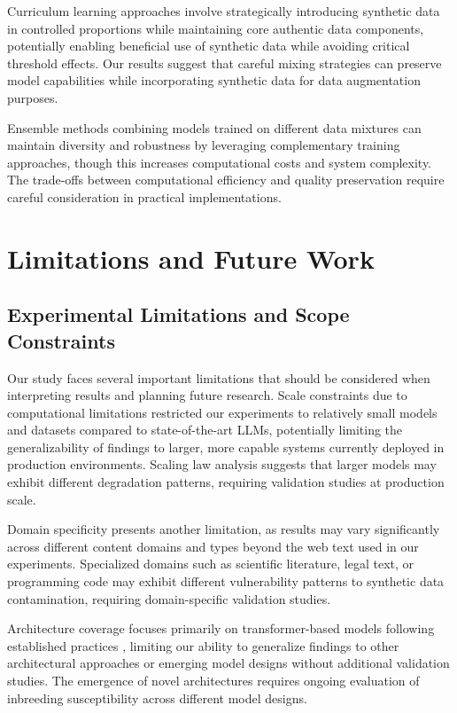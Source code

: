 \documentclass{article}
\begin{document}
Curriculum learning approaches involve strategically introducing synthetic data in controlled proportions while maintaining core authentic data components, potentially enabling beneficial use of synthetic data while avoiding critical threshold effects. Our results suggest that careful mixing strategies can preserve model capabilities while incorporating synthetic data for data augmentation purposes.

Ensemble methods combining models trained on different data mixtures can maintain diversity and robustness by leveraging complementary training approaches, though this increases computational costs and system complexity. The trade-offs between computational efficiency and quality preservation require careful consideration in practical implementations.

\section{Limitations and Future Work}

\subsection{Experimental Limitations and Scope Constraints}

Our study faces several important limitations that should be considered when interpreting results and planning future research. Scale constraints due to computational limitations restricted our experiments to relatively small models and datasets compared to state-of-the-art LLMs, potentially limiting the generalizability of findings to larger, more capable systems currently deployed in production environments. Scaling law analysis suggests that larger models may exhibit different degradation patterns, requiring validation studies at production scale.

Domain specificity presents another limitation, as results may vary significantly across different content domains and types beyond the web text used in our experiments. Specialized domains such as scientific literature, legal text, or programming code may exhibit different vulnerability patterns to synthetic data contamination, requiring domain-specific validation studies.

Architecture coverage focuses primarily on transformer-based models following established practices \cite{vaswani2017attention}, limiting our ability to generalize findings to other architectural approaches or emerging model designs without additional validation studies. The emergence of novel architectures requires ongoing evaluation of inbreeding susceptibility across different model designs.
\end{document}
